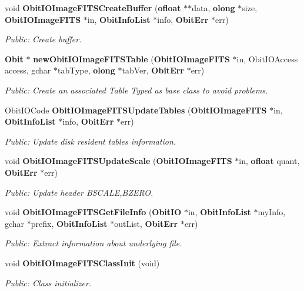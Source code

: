 \begin{CompactItemize}
void {\bf Obit\-IOImage\-FITSCreate\-Buffer} ({\bf ofloat} $\ast$$\ast$data, {\bf olong} $\ast$size, {\bf Obit\-IOImage\-FITS} $\ast$in, {\bf Obit\-Info\-List} $\ast$info, {\bf Obit\-Err} $\ast$err)
\begin{CompactList}\small\item\em Public: Create buffer. \item\end{CompactList}\item 
{\bf Obit} $\ast$ {\bf new\-Obit\-IOImage\-FITSTable} ({\bf Obit\-IOImage\-FITS} $\ast$in, Obit\-IOAccess access, gchar $\ast$tab\-Type, {\bf olong} $\ast$tab\-Ver, {\bf Obit\-Err} $\ast$err)
\begin{CompactList}\small\item\em Public: Create an associated Table Typed as base class to avoid problems. \item\end{CompactList}\item 
Obit\-IOCode {\bf Obit\-IOImage\-FITSUpdate\-Tables} ({\bf Obit\-IOImage\-FITS} $\ast$in, {\bf Obit\-Info\-List} $\ast$info, {\bf Obit\-Err} $\ast$err)
\begin{CompactList}\small\item\em Public: Update disk resident tables information. \item\end{CompactList}\item 
void {\bf Obit\-IOImage\-FITSUpdate\-Scale} ({\bf Obit\-IOImage\-FITS} $\ast$in, {\bf ofloat} quant, {\bf Obit\-Err} $\ast$err)
\begin{CompactList}\small\item\em Public: Update header BSCALE,BZERO. \item\end{CompactList}\item 
void {\bf Obit\-IOImage\-FITSGet\-File\-Info} ({\bf Obit\-IO} $\ast$in, {\bf Obit\-Info\-List} $\ast$my\-Info, gchar $\ast$prefix, {\bf Obit\-Info\-List} $\ast$out\-List, {\bf Obit\-Err} $\ast$err)
\begin{CompactList}\small\item\em Public: Extract information about underlying file. \item\end{CompactList}\item 
void {\bf Obit\-IOImage\-FITSClass\-Init} (void)
\begin{CompactList}\small\item\em Public: Class initializer. \item\end{CompactList}\end{CompactItemize}


